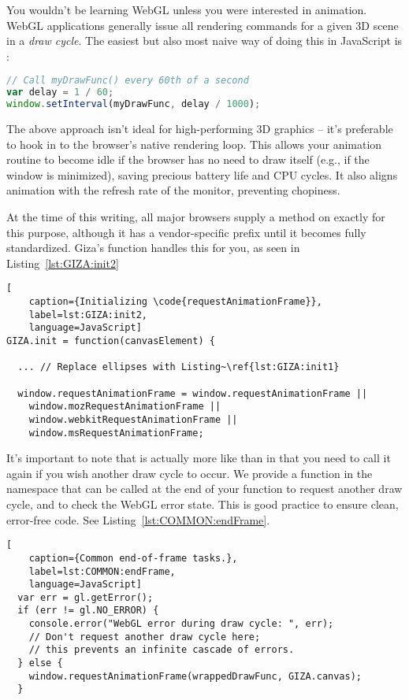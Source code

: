 You wouldn't be learning WebGL unless you were interested in animation.  WebGL applications generally issue all rendering commands for a given 3D scene in a \emph{draw cycle}.  The easiest but also most naive way of doing this in JavaScript is :

\begin{lstlisting}[language=JavaScript]
// Call myDrawFunc() every 60th of a second
var delay = 1 / 60;
window.setInterval(myDrawFunc, delay / 1000);
\end{lstlisting}

The above approach isn't ideal for high-performing 3D graphics -- it's preferable to hook in to the browser's native rendering loop.  This allows your animation routine to become idle if the browser has no need to draw itself (e.g., if the window is minimized), saving precious battery life and CPU cycles.  It also aligns animation with the refresh rate of the monitor, preventing chopiness.

At the time of this writing, all major browsers supply a method on  exactly for this purpose, although it has a vendor-specific prefix until it becomes fully standardized.  Giza's  function handles this for you, as seen in Listing~\ref{lst:GIZA:init2}

\begin{lstlisting}[
    caption={Initializing \code{requestAnimationFrame}},
    label=lst:GIZA:init2,
    language=JavaScript]
GIZA.init = function(canvasElement) {

  ... // Replace ellipses with Listing~\ref{lst:GIZA:init1}

  window.requestAnimationFrame = window.requestAnimationFrame ||
    window.mozRequestAnimationFrame ||
    window.webkitRequestAnimationFrame ||
    window.msRequestAnimationFrame;
\end{lstlisting} 

It's important to note that  is actually more like  than  in that you need to call it again if you wish another draw cycle to occur.  We provide a function in the  namespace that can be called at the end of your function to request another draw cycle, and to check the WebGL error state.  This is good practice to ensure clean, error-free code.  See Listing~\ref{lst:COMMON:endFrame}.

\begin{lstlisting}[
    caption={Common end-of-frame tasks.},
    label=lst:COMMON:endFrame,
    language=JavaScript]
  var err = gl.getError();
  if (err != gl.NO_ERROR) {
    console.error("WebGL error during draw cycle: ", err);
    // Don't request another draw cycle here;
    // this prevents an infinite cascade of errors.
  } else {
    window.requestAnimationFrame(wrappedDrawFunc, GIZA.canvas);
  }
\end{lstlisting} 

